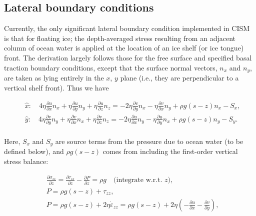 
\subsection{Lateral boundary conditions}
Currently, the only significant lateral boundary condition implemented in CISM 
is that for floating ice; the depth-averaged stress resulting from an adjacent column of ocean water is applied at the location of an ice shelf (or ice tongue) front. The derivation largely follows those for the free surface and specified basal traction boundary conditions, except that the surface normal vectors, $n_{x}$ and $n_{y}$, are taken as lying entirely in the $x$, $y$ plane (i.e., they are perpendicular to a vertical shelf front). Thus we have

\begin{equation}
\begin{split}
  & \hat{x}:\quad 4\eta \frac{\partial u}{\partial x}n_{x}+\eta \frac{\partial u}{\partial y}n_{y}+\eta \frac{\partial u}{\partial z}n_{z}=-2\eta \frac{\partial v}{\partial y}n_{x}-\eta \frac{\partial v}{\partial x}n_{y}+\rho g\left( s-z \right)n_{x}-S_{x}, \\ 
 & \hat{y}:\quad 4\eta \frac{\partial v}{\partial y}n_{y}+\eta \frac{\partial v}{\partial x}n_{x}+\eta \frac{\partial v}{\partial z}n_{z}=-2\eta \frac{\partial u}{\partial x}n_{y}-\eta \frac{\partial u}{\partial y}n_{x}+\rho g\left( s-z \right)n_{y}-S_{y}. \\ 
\end{split}
\end{equation}

\noindent
Here, $S_x$ and $S_y$ are source terms from the pressure due to ocean water (to be defined below), and $\rho g\left( s-z \right)$ comes from including the first-order vertical stress balance:

\begin{equation}
\begin{split}
  & \frac{\partial \sigma _{zz}}{\partial z}=\frac{\partial \tau _{zz}}{\partial z}-\frac{\partial P}{\partial z}=\rho g\quad \text{(integrate w}\text{.r}\text{.t}\text{. $z$)}, \\ 
 & P=\rho g\left( s-z \right)+\tau _{zz}, \\ 
 & P=\rho g\left( s-z \right)+2\eta \dot{\varepsilon }_{zz}=\rho g\left( s-z \right)+2\eta \left( -\frac{\partial u}{\partial x}-\frac{\partial v}{\partial y} \right), \\ 
\end{split}
\end{equation}

